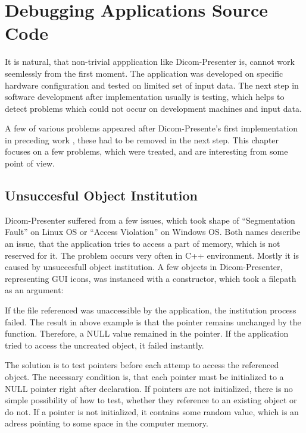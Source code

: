 \chapter{Debugging Applications Source Code}
\vspace{-10mm}
It is natural, that non-trivial appplication like Dicom-Presenter is, cannot work seemlessly from the first moment. The application was developed on specific hardware configuration and tested on limited set of input data. The next step in software development after implementation usually is testing, which helps to detect problems which could not occur on development machines and input data.

A few of various problems appeared after Dicom-Presente's first implementation in preceding work \cite{neskudla}, these had to be removed in the next step. This chapter focuses on a few problems, which were treated, and are interesting from some point of view.

\section{Unsuccesful Object Institution}
Dicom-Presenter suffered from a few issues, which took shape of ``Segmentation Fault'' on Linux OS or ``Access Violation'' on Windows OS. Both names describe an issue, that the application tries to access a part of memory, which is not reserved for it. The problem occurs very often in C++ environment. Mostly it is caused by unsuccesfull object institution. A few objects in Dicom-Presenter, representing GUI icons, was instanced with a constructor, which took a filepath as an argument:


If the file referenced was unaccessible by the application, the institution process failed. The result in above example is that the  pointer remains unchanged by the  function. Therefore, a NULL value remained in the pointer. If the application tried to access the uncreated object, it failed instantly.

The solution is to test pointers before each attemp to access the referenced object. The necessary condition is, that each pointer  must be initialized to a NULL pointer right after declaration. If pointers are not initialized, there is no simple possibility of how to test, whether they reference to an existing object or do not. If a pointer is not initialized, it contains some random value, which is an adress pointing to some space in the computer memory.

